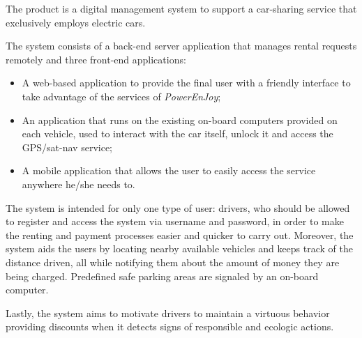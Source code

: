 The product is a digital management system to support a car-sharing service that exclusively employs electric cars.

The system consists of a back-end server application that manages rental requests remotely and three front-end applications:

\begin{itemize}
\item A web-based application to provide the final user with a friendly interface to take advantage of the services of \hbox{\emph{PowerEnJoy}};
\item An application that runs on the existing on-board computers provided on each vehicle, used to interact with the car itself, unlock it and access the GPS/sat-nav service;
\item A mobile application that allows the user to easily access the service anywhere he/she needs to.
\end{itemize}

The system is intended for only one type of user: drivers, who should be allowed to register and access the system via username and password, in order to make the renting and payment processes easier and quicker to carry out. Moreover, the system aids the users by locating nearby available vehicles and keeps track of the distance driven, all while notifying them about the amount of money they are being charged. Predefined safe parking areas are signaled by an on-board computer.

Lastly, the system aims to motivate drivers to maintain a virtuous behavior providing discounts when it detects signs of responsible and ecologic actions.
